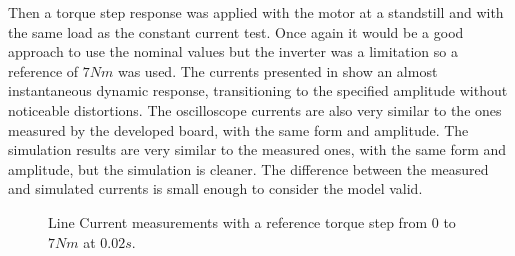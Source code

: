 Then a torque step response was applied with the motor at a standstill and with the same load as the constant current test. Once again it would be a good approach to use the nominal values but the inverter was a limitation so a reference of $7Nm$ was used. The currents presented in  show an almost instantaneous dynamic response, transitioning to the specified amplitude without noticeable distortions. The oscilloscope currents are also very similar to the ones measured by the developed board, with the same form and amplitude. The simulation results are very similar to the measured ones, with the same form and amplitude, but the simulation is cleaner.  The difference between the measured and simulated currents is small enough to consider the model valid.
\begin{figure}[!htb]
	\begin{subfigmatrix}{2}
	\end{subfigmatrix}
	\caption{Line Current measurements with a reference torque step from $0$ to $7Nm$ at $0.02s$.}
	\label{fig:tq_step_fig} %
\end{figure}



